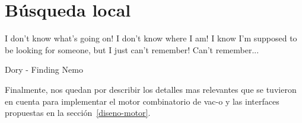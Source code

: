 \chapter{B\'usqueda local}
\label{busqueda}
\epigraph{I don't know what's going on! I don't know where I am! I know I'm
supposed to be looking for someone, but I just can't remember! Can't
remember...}%
{Dory - Finding Nemo}

Finalmente, nos quedan por describir los detalles mas relevantes que se
tuvieron en cuenta para implementar el motor combinatorio de \ac{vac-o} y las
interfaces propuestas en la secci\'on~\ref{diseno-motor}.